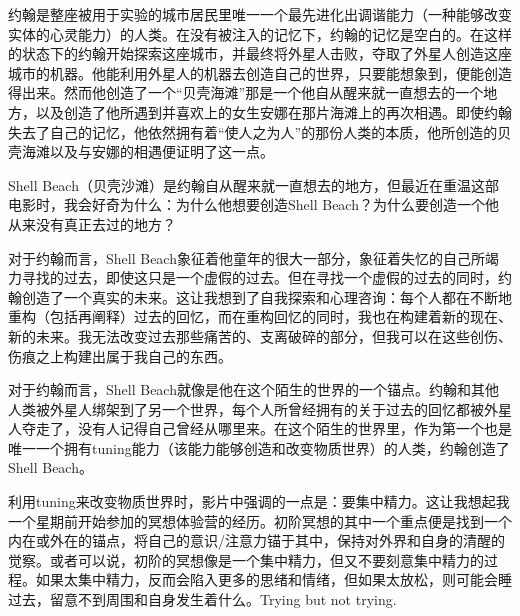 {

约翰是整座被用于实验的城市居民里唯一一个最先进化出调谐能力（一种能够改变实体的心灵能力）的人类。在没有被注入的记忆下，约翰的记忆是空白的。在这样的状态下的约翰开始探索这座城市，并最终将外星人击败，夺取了外星人创造这座城市的机器。他能利用外星人的机器去创造自己的世界，只要能想象到，便能创造得出来。然而他创造了一个“贝壳海滩”\pozhehao{}那是一个他自从醒来就一直想去的一个地方，以及创造了他所遇到并喜欢上的女生安娜在那片海滩上的再次相遇。即使约翰失去了自己的记忆，他依然拥有着“使人之为人”的那份人类的本质，他所创造的贝壳海滩以及与安娜的相遇便证明了这一点。

}

\tristarsepline

Shell Beach（贝壳沙滩）是约翰自从醒来就一直想去的地方，但最近在重温这部电影时，我会好奇为什么：为什么他想要创造Shell Beach？为什么要创造一个他从来没有真正去过的地方？

对于约翰而言，Shell Beach象征着他童年的很大一部分，象征着失忆的自己所竭力寻找的过去，即使这只是一个虚假的过去。但在寻找一个虚假的过去的同时，约翰创造了一个真实的未来。这让我想到了自我探索和心理咨询：每个人都在不断地重构（包括再阐释）过去的回忆，而在重构回忆的同时，我也在构建着新的现在、新的未来。我无法改变过去那些痛苦的、支离破碎的部分，但我可以在这些创伤、伤痕之上构建出属于我自己的东西。

对于约翰而言，Shell Beach就像是他在这个陌生的世界的一个锚点。约翰和其他人类被外星人绑架到了另一个世界，每个人所曾经拥有的关于过去的回忆都被外星人夺走了，没有人记得自己曾经从哪里来。在这个陌生的世界里，作为第一个也是唯一一个拥有tuning能力（该能力能够创造和改变物质世界）的人类，约翰创造了Shell Beach。

利用tuning来改变物质世界时，影片中强调的一点是：要集中精力。这让我想起我一个星期前开始参加的冥想体验营的经历。初阶冥想的其中一个重点便是找到一个内在或外在的锚点，将自己的意识/注意力锚于其中，保持对外界和自身的清醒的觉察。或者可以说，初阶的冥想像是一个集中精力，但又不要刻意集中精力的过程。如果太集中精力，反而会陷入更多的思绪和情绪，但如果太放松，则可能会睡过去，留意不到周围和自身发生着什么。Trying but not trying.

